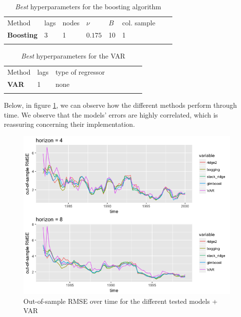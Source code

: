 \begin{table}[!htb]
\begin{center}
\caption{\textit{Best} hyperparameters for the boosting algorithm}
\label{tab:bestparamsbagrvfl}       %
\begin{tabular}{llllllll}
\hline\noalign{\smallskip}
Method & lags & nodes & $\nu$ & $B$ & col. sample  &  & \\
\noalign{\smallskip}\hline\noalign{\smallskip}
  \textbf{Boosting} & 3 & 1 & $0.175$ & 10 & 1 & & \\
\noalign{\smallskip}\hline
\end{tabular}
\end{center}
\end{table}

\begin{table}[!htb]
\begin{center}
\caption{\textit{Best} hyperparameters for the VAR}
\label{tab:bestparamsvar}       %
\begin{tabular}{llllllll}
\hline\noalign{\smallskip}
Method & lags & type of regressor &  &  &  &  & \\
\noalign{\smallskip}\hline\noalign{\smallskip}
  \textbf{VAR} & 1 & none &  & &  & & \\
\noalign{\smallskip}\hline
\end{tabular}
\end{center}
\end{table}

\newpage

Below, in figure \ref{oos_rmse_over_time}, we can observe how the different methods perform through time. We observe that the models' errors are highly correlated, which is reassuring concerning their implementation.

\begin{figure}[!htb]
\centering
\includegraphics[width=14cm]{gfx/chapter-rvfl-ensembles/oos_rmse_over_time.png}
\caption{Out-of-sample RMSE over time for the different tested models + VAR}
\label{oos_rmse_over_time}
\end{figure}

